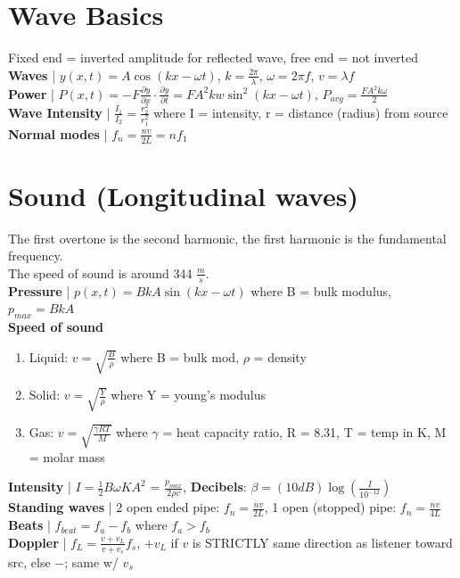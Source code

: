 \documentclass{article}
\begin{document}
\section{Wave Basics}
\vspace{-2mm}
Fixed end = inverted amplitude for reflected wave, free end = not inverted \\
\textbf{Waves} | $y(x, t) = A\cos{(kx - \omega t)}$,
    $k = \frac{2\pi}{\lambda}$,
    $\omega = 2\pi f$,
    $v = \lambda f$ \\
\textbf{Power} | 
$P(x, t) = -F \frac{\partial y}{\partial x} \cdot \frac{\partial y}{\partial t} = FA^2kw\sin^2{(kx - \omega t)}$,
    $P_{avg} = \frac{FA^2k \omega}{2}$ \\
\textbf{Wave Intensity} | $\frac{I_1}{I_2} = \frac{r_2^2}{r_1^2}$ where I = intensity, r = distance (radius) from source \\
\textbf{Normal modes} | $f_n = \frac{nv}{2L} = nf_1$

\vspace{-5mm}
\section{Sound (Longitudinal waves)}
\vspace{-4mm}
The first overtone is the second harmonic, the first harmonic is the fundamental frequency. \\
The speed of sound is around 344 $\frac{m}{s}$. \\
\textbf{Pressure} | $p(x, t) = BkA\sin{(kx - \omega t)}$ where B = bulk modulus, $p_{max} = BkA$ \\
\textbf{Speed of sound} 
\begin{enumerate}
    \vspace{-4mm}
    \item Liquid: $v = \sqrt{\frac{B}{\rho}}$ where B = bulk mod, $\rho$ = density
    \vspace{-3mm}
    \item Solid: $v = \sqrt{\frac{Y}{\rho}}$ where Y = young's modulus
    \vspace{-3mm}
    \item Gas: $v = \sqrt{\frac{\gamma RT}{M}}$ where $\gamma$ = heat capacity ratio, R = 8.31, T = temp in K, M = molar mass
\end{enumerate}
\vspace{-3mm}
\textbf{Intensity} | $I = \frac{1}{2}B \omega KA^2$ = $\frac{p_{max}}{2 \rho v}$, 
    \textbf{Decibels}: $\beta = (10dB) \log{(\frac{I}{10^{-12}})}$ \\
\textbf{Standing waves} | 2 open ended pipe: $f_n = \frac{nv}{2L}$, 
    1 open (stopped) pipe: $f_n = \frac{nv}{4L}$ \\
\textbf{Beats} | $f_{beat} = f_a - f_b$ where $f_a > f_b$ \\
\textbf{Doppler} | $f_L = \frac{v + v_L}{v + v_s} f_s$, $+v_L$ if $v$ is STRICTLY  same direction as listener toward src, else $-$; same w/ $v_s$ \\
\vspace{-5mm}
\end{document}
